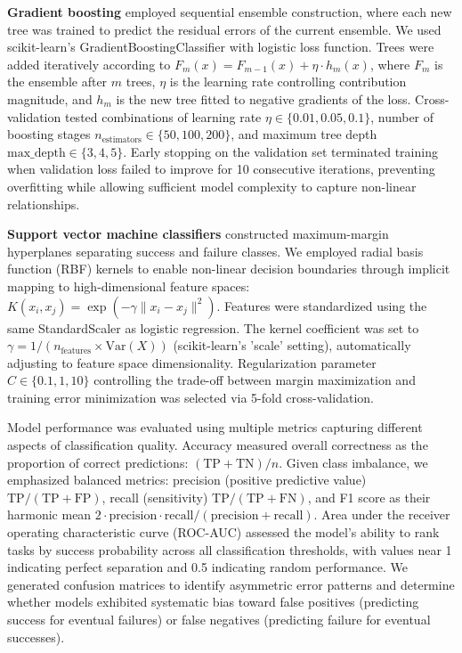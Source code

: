 \documentclass[]{article}
\begin{document}
\textbf{Gradient boosting} employed sequential ensemble construction, where each new tree was trained to predict the residual errors of the current ensemble. We used scikit-learn's GradientBoostingClassifier with logistic loss function. Trees were added iteratively according to $F_m(x) = F_{m-1}(x) + \eta \cdot h_m(x)$, where $F_m$ is the ensemble after $m$ trees, $\eta$ is the learning rate controlling contribution magnitude, and $h_m$ is the new tree fitted to negative gradients of the loss. Cross-validation tested combinations of learning rate $\eta \in \{0.01, 0.05, 0.1\}$, number of boosting stages $n_{\text{estimators}} \in \{50, 100, 200\}$, and maximum tree depth $\text{max\_depth} \in \{3, 4, 5\}$. Early stopping on the validation set terminated training when validation loss failed to improve for 10 consecutive iterations, preventing overfitting while allowing sufficient model complexity to capture non-linear relationships.

\textbf{Support vector machine classifiers} constructed maximum-margin hyperplanes separating success and failure classes. We employed radial basis function (RBF) kernels to enable non-linear decision boundaries through implicit mapping to high-dimensional feature spaces: $K(x_i, x_j) = \exp(-\gamma \|x_i - x_j\|^2)$. Features were standardized using the same StandardScaler as logistic regression. The kernel coefficient was set to $\gamma = 1/(n_{\text{features}} \times \text{Var}(X))$ (scikit-learn's 'scale' setting), automatically adjusting to feature space dimensionality. Regularization parameter $C \in \{0.1, 1, 10\}$ controlling the trade-off between margin maximization and training error minimization was selected via 5-fold cross-validation.

Model performance was evaluated using multiple metrics capturing different aspects of classification quality. Accuracy measured overall correctness as the proportion of correct predictions: $(\text{TP} + \text{TN}) / n$. Given class imbalance, we emphasized balanced metrics: precision (positive predictive value) $\text{TP} / (\text{TP} + \text{FP})$, recall (sensitivity) $\text{TP} / (\text{TP} + \text{FN})$, and F1 score as their harmonic mean $2 \cdot \text{precision} \cdot \text{recall} / (\text{precision} + \text{recall})$. Area under the receiver operating characteristic curve (ROC-AUC) assessed the model's ability to rank tasks by success probability across all classification thresholds, with values near 1 indicating perfect separation and 0.5 indicating random performance. We generated confusion matrices to identify asymmetric error patterns and determine whether models exhibited systematic bias toward false positives (predicting success for eventual failures) or false negatives (predicting failure for eventual successes).
\end{document}
